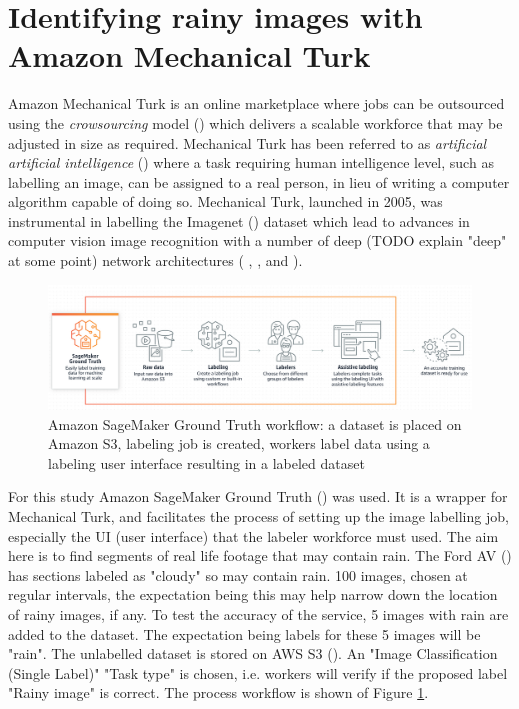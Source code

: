 \section{Identifying rainy images with Amazon Mechanical Turk}

Amazon Mechanical Turk \cite{crowston2012amazon} is an online marketplace where jobs can be outsourced using the \textit{crowsourcing} model  (\cite{vukovic2009crowdsourcing}) which delivers a scalable workforce that may be adjusted in size as required. Mechanical Turk has been referred to as \textit{artificial artificial intelligence} (\cite{dai2011artificial}) where a task requiring human intelligence level, such as labelling an image, can be assigned to a real person, in lieu of writing  a computer algorithm capable of doing so. Mechanical Turk, launched in 2005, was instrumental in labelling the Imagenet (\cite{deng2009imagenet}) dataset which lead to advances in computer vision image recognition with a number of deep (TODO explain "deep" at some point) network architectures ( \cite{krizhevsky2012imagenet}, \cite{he2015deep}, \cite{szegedy2014going} and \cite{simonyan2015deep}). 

\begin{figure}[h!]
 \centering 
 \includegraphics[width=\textwidth]{Figures/SageMakerGroundTruth.png}
 \caption{Amazon SageMaker Ground Truth workflow: a dataset is placed on Amazon S3, labeling job is created, workers label data using a labeling user interface resulting in a labeled dataset}
 \label{fig:amazon-ground-truth}
\end{figure}

For this study Amazon SageMaker Ground Truth (\cite{SageMakerGroundTruthDocumentation2020}) was used. It is a wrapper for Mechanical Turk, and facilitates the process of setting up the image labelling job, especially the UI (user interface) that the labeler workforce must used.  
The aim here is to find segments of real life footage that may contain rain. The Ford AV (\cite{agarwal2020ford}) has sections labeled as "cloudy" so may contain rain. 100 images, chosen at regular intervals, the expectation being this may help narrow down the location of rainy images, if any. To test the accuracy of the service, 5 images with rain are added to the dataset. The expectation being labels for these 5 images will be "rain". 
The unlabelled dataset is stored on AWS S3 (\cite{AmazonS3Documentation2020}). An "Image Classification (Single Label)" "Task type" is chosen, i.e. workers will verify if the proposed label "Rainy image" is correct. The process workflow is shown of Figure \ref{fig:amazon-ground-truth}.




